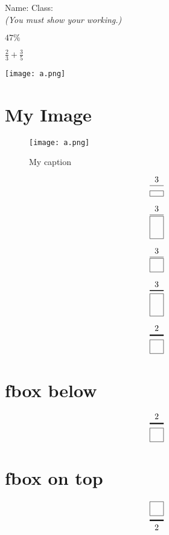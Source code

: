 \documentclass{article}
\date{}
\begin{document}
\fontsize{14}{16} \selectfont

 \qquad Name: \hspace{5cm}  Class: \hspace{5cm}  \\
\vspace{20pt} 
\textit{(You must show your working.)  }
\vspace{5pt}

\hline
\vspace{10pt}
 $ 47\% $  
\vspace{100pt}

\hline
\vspace{10pt}
 \quad $ \frac{2}{3} + \frac{3}{5} $  
\vspace{110pt}

\begin{center}
\texttt{[image: a.png]}
\end{center}

\section{My Image}

\begin{figure}[h] %
  \centering
  \texttt{[image: a.png]} %
  \caption{My caption}
  \label{fig:my_label}
\end{figure}

\[
\frac{3}{\fbox{\hspace{1em}}} %
\]

\[
\frac{3}{\fbox{\makebox[1em]{\rule{0pt}{2em}}}} %
\]

\[
\frac{3}{\fbox{\makebox[1em]{\rule{0pt}{1em}}}} %
\]

\[
\genfrac{}{}{1pt}{0}{3}{\fbox{\makebox[1em]{\rule{0pt}{2em}}}} %
\]

\[
\genfrac{}{}{1.5pt}{0}{2}{\fbox{\makebox[1em]{\rule{0pt}{1em}}}} %
\]

\section{fbox below}
\[
\genfrac{}{}{1.5pt}{0}{2}{\fbox{\makebox[1em]{\rule{0pt}{1em}}}} %
\]

\section{fbox on top}
\[
\genfrac{}{}{1.5pt}{0}{\fbox{\makebox[1em]{\rule{0pt}{1em}}}}{2} %
\]
\end{document}
